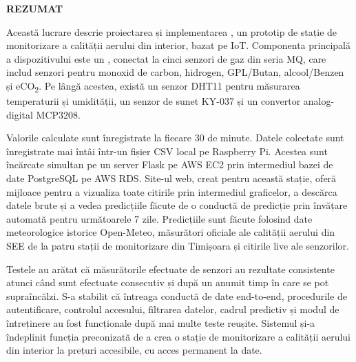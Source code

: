 % 

\thispagestyle{plain}

\vspace*{3\baselineskip}

\begin{center}
{\fontsize{20}{24}\selectfont\textbf{\MakeUppercase{Rezumat}}}
\end{center}

\vspace{2\baselineskip}

Această lucrare descrie proiectarea și implementarea \airnest{}, un prototip de stație de
monitorizare a calității aerului din interior, bazat pe IoT. Componenta principală a
dispozitivului este un \RPi{}, conectat la cinci senzori de gaz din seria MQ, care includ
senzori pentru monoxid de carbon, hidrogen, GPL/Butan, alcool/Benzen și eCO\textsubscript{2}.
Pe lângă acestea, există un senzor DHT11 pentru măsurarea temperaturii și umidității, un
senzor de sunet KY-037 și un convertor analog-digital MCP3208.

Valorile calculate sunt înregistrate la fiecare 30 de minute. Datele colectate sunt înregistrate
mai întâi într-un fișier CSV local pe Raspberry Pi. Acestea sunt încărcate simultan pe un server
Flask pe AWS EC2 prin intermediul bazei de date PostgreSQL pe AWS RDS. Site-ul web, creat pentru
această stație, oferă mijloace pentru a vizualiza toate citirile prin intermediul graficelor,
a descărca datele brute și a vedea predicțiile făcute de o conductă de predicție prin
învățare automată pentru următoarele 7 zile. Predicțiile sunt făcute folosind date
meteorologice istorice Open-Meteo, măsurători oficiale ale calității aerului din SEE de la
patru stații de monitorizare din Timișoara și citirile live ale senzorilor.

Testele au arătat că măsurătorile efectuate de senzori au rezultate consistente atunci când sunt
efectuate consecutiv și după un anumit timp în care se pot supraîncălzi. S-a stabilit că
întreaga conductă de date end-to-end, procedurile de autentificare, controlul accesului,
filtrarea datelor, cadrul predictiv și modul de întreținere au fost funcționale după mai
multe teste reușite. Sistemul și-a îndeplinit funcția preconizată de a crea o stație de
monitorizare a calității aerului din interior la prețuri accesibile, cu acces permanent la date.

